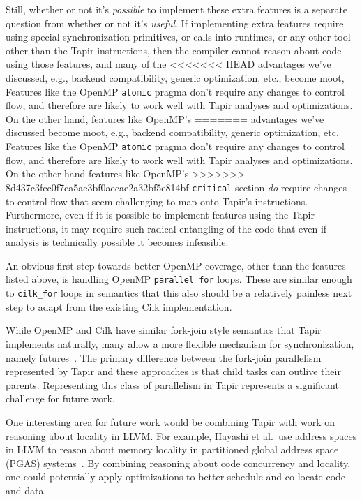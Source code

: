 \documentclass[sigconf]{acmart}
\begin{document}
Still, whether or not it's \emph{possible} to implement these extra features
is a separate question from whether or not it's \emph{useful}. If implementing
extra features require using special synchronization primitives, or calls into
runtimes, or any other tool other than the Tapir instructions, then the
compiler cannot reason about code using those features, and many of the
<<<<<<< HEAD
advantages we've discussed, e.g., backend compatibility, generic 
optimization, etc., become moot, Features like the OpenMP \texttt{atomic} pragma don't 
require any changes to control flow, and therefore are likely to work well 
with Tapir analyses and optimizations. On the other hand, features like OpenMP's
=======
advantages we've discussed become moot, e.g., backend compatibility, generic
optimization, etc. Features like the OpenMP \texttt{atomic} pragma don't
require any changes to control flow, and therefore are likely to work well
with Tapir analyses and optimizations. On the other hand features like OpenMP's
>>>>>>> 8d437c3fcc0f7ca5ae3bf0aecae2a32bf5e814bf
\texttt{critical} section \emph{do} require changes to control flow that seem
challenging to map onto Tapir's instructions. Furthermore, even if it
is possible to implement features using the Tapir instructions, it may require
such radical entangling of the code that even if analysis is technically
possible it becomes infeasible.

An obvious first step towards better OpenMP coverage, other than the features
listed above, is handling OpenMP \texttt{parallel for} loops. These are similar enough
to \texttt{cilk\_for} loops in semantics that this also should be a relatively
painless next step to adapt from the existing Cilk implementation.

While OpenMP and Cilk have similar fork-join style semantics that Tapir
implements naturally, many allow a more flexible mechanism for synchronization, namely
futures~\cite{qthreads, chapel, hpx}. The primary difference between the
fork-join parallelism represented by Tapir and these approaches is that
child tasks can outlive their parents. Representing this class
of parallelism in Tapir represents a significant challenge for future work.

One interesting area for future work would be combining Tapir with work on
reasoning about locality in LLVM. For example, Hayashi et al.\
use address spaces in LLVM to reason about memory
locality in partitioned global address space (PGAS) systems~\cite{hayashi2015llvm}. By combining
reasoning about code concurrency and locality, one could potentially apply
optimizations to better schedule and co-locate code and data.
\end{document}
